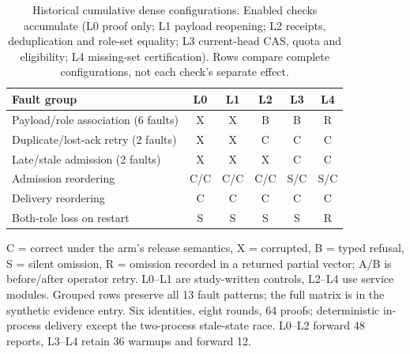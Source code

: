 \begin{table}[t]
\centering
\caption{Historical cumulative dense configurations. Enabled checks accumulate
(L0 proof only; L1 payload reopening; L2 receipts, deduplication and role-set
equality; L3 current-head CAS, quota and eligibility; L4 missing-set certification).
Rows compare complete configurations, not each check's separate effect.}
\label{tab:stress-ladder}
\footnotesize
\setlength{\tabcolsep}{2pt}
\begin{tabularx}{\columnwidth}{@{}Xccccc@{}}
\toprule
Fault group & L0 & L1 & L2 & L3 & L4 \\
\midrule
Payload/role association (6 faults) & X & X & B & B & R \\
Duplicate/lost-ack retry (2 faults) & X & X & C & C & C \\
Late/stale admission (2 faults) & X & X & X & C & C \\
Admission reordering & C/C & C/C & C/C & S/C & S/C \\
Delivery reordering & C & C & C & C & C \\
Both-role loss on restart & S & S & S & S & R \\
\bottomrule
\end{tabularx}
\par\smallskip
\raggedright C = correct under the arm's release semantics, X = corrupted,
B = typed refusal, S = silent omission, R = omission recorded in a returned
partial vector; A/B is before/after operator retry. L0--L1 are study-written
controls, L2--L4 use service modules. Grouped rows preserve all 13 fault
patterns; the full matrix is in the synthetic evidence entry. Six identities,
eight rounds, 64 proofs; deterministic in-process delivery except the two-process stale-state
race. L0--L2 forward 48 reports, L3--L4 retain 36 warmups and forward 12.
\end{table}
